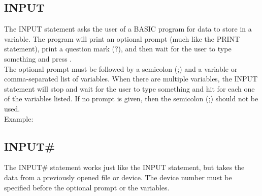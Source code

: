 
\subsection{INPUT}

The {\ttfamily INPUT} statement asks the user of a BASIC program for data to
store in a variable.  The program will print an optional prompt (much like the
{\ttfamily PRINT} statement), print a question mark (?), and then wait for the
user to type something and press
.\\

The optional prompt must be followed by a semicolon (;) and a variable or
comma-separated list of variables.  When there are multiple variables, the
{\ttfamily INPUT} statement will stop and wait for the user to type something
and hit  for each one of the variables listed.  If no prompt is
given, then the semicolon (;) should not be used.\\

Example:\\



\subsection{INPUT\#}

The {\ttfamily INPUT\#} statement works just like the {\ttfamily INPUT}
statement, but takes the data from a previously opened file or device.  The
device number must be specified before the optional prompt or the variables.\\


